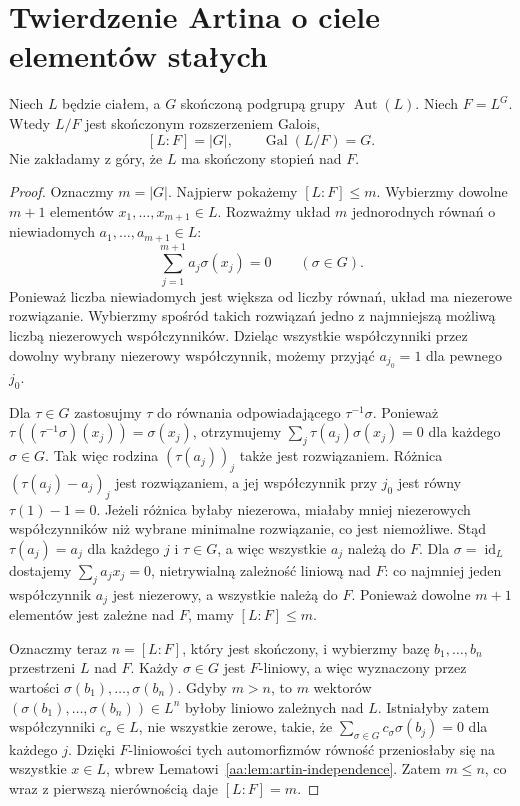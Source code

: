 \section{Twierdzenie Artina o ciele elementów stałych}
\begin{twierdzenie}
\label{aa:tw:artin-fixed-field}
Niech $L$ będzie ciałem, a $G$ skończoną podgrupą
grupy $\operatorname{Aut}(L)$. Niech $F=L^G$.
Wtedy $L/F$ jest skończonym rozszerzeniem Galois,
\[
[L:F]=|G|,\qquad \operatorname{Gal}(L/F)=G.
\]
Nie zakładamy z góry, że $L$ ma skończony stopień
nad $F$.
\end{twierdzenie}
\begin{proof}
Oznaczmy $m=|G|$. Najpierw pokażemy $[L:F]\le m$.
Wybierzmy dowolne $m+1$ elementów $x_1,\ldots,x_{m+1}\in L$.
Rozważmy układ $m$ jednorodnych równań o niewiadomych
$a_1,\ldots,a_{m+1}\in L$:
\[
\sum_{j=1}^{m+1}a_j\sigma(x_j)=0
\qquad(\sigma\in G).
\]
Ponieważ liczba niewiadomych jest większa od liczby
równań, układ ma niezerowe rozwiązanie.
Wybierzmy spośród takich rozwiązań jedno z najmniejszą
możliwą liczbą niezerowych współczynników.
Dzieląc wszystkie współczynniki przez dowolny wybrany
niezerowy współczynnik, możemy przyjąć $a_{j_0}=1$
dla pewnego $j_0$.

Dla $\tau\in G$ zastosujmy $\tau$ do równania
odpowiadającego $\tau^{-1}\sigma$.
Ponieważ $\tau((\tau^{-1}\sigma)(x_j))=\sigma(x_j)$,
otrzymujemy
$\sum_j\tau(a_j)\sigma(x_j)=0$ dla każdego $\sigma\in G$.
Tak więc rodzina $(\tau(a_j))_j$ także jest rozwiązaniem.
Różnica $(\tau(a_j)-a_j)_j$ jest rozwiązaniem,
a jej współczynnik przy $j_0$ jest równy
$\tau(1)-1=0$. Jeżeli różnica byłaby niezerowa,
miałaby mniej niezerowych współczynników niż wybrane
minimalne rozwiązanie, co jest niemożliwe.
Stąd $\tau(a_j)=a_j$ dla każdego $j$ i $\tau\in G$,
a więc wszystkie $a_j$ należą do $F$.
Dla $\sigma=\operatorname{id}_L$ dostajemy
$\sum_j a_jx_j=0$, nietrywialną zależność liniową
nad $F$: co najmniej jeden współczynnik $a_j$ jest
niezerowy, a wszystkie należą do $F$.
Ponieważ dowolne $m+1$ elementów jest
zależne nad $F$, mamy $[L:F]\le m$.

Oznaczmy teraz $n=[L:F]$, który jest skończony,
i wybierzmy bazę $b_1,\ldots,b_n$ przestrzeni $L$ nad $F$.
Każdy $\sigma\in G$ jest $F$-liniowy, a więc wyznaczony
przez wartości $\sigma(b_1),\ldots,\sigma(b_n)$.
Gdyby $m>n$, to $m$ wektorów
$(\sigma(b_1),\ldots,\sigma(b_n))\in L^n$ byłoby
liniowo zależnych nad $L$. Istniałyby zatem
współczynniki $c_\sigma\in L$, nie wszystkie zerowe,
takie, że $\sum_{\sigma\in G}c_\sigma\sigma(b_j)=0$
dla każdego $j$. Dzięki $F$-liniowości tych automorfizmów
równość przeniosłaby się na wszystkie $x\in L$, wbrew
Lematowi~\ref{aa:lem:artin-independence}.
Zatem $m\le n$, co wraz z pierwszą nierównością daje
$[L:F]=m$.


\end{proof}
